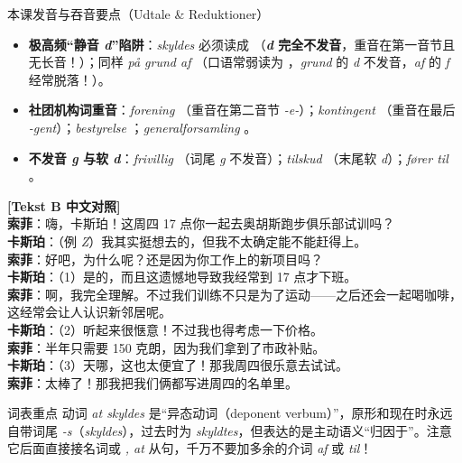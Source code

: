 \begin{tipbox}{本课发音与吞音要点（Udtale \& Reduktioner）}
\begin{itemize}
  \item \textbf{极高频“静音 \textit{d}”陷阱}：\textit{skyldes} 必须读成 （\textbf{\textit{d} 完全不发音}，重音在第一音节且无长音！）；同样 \textit{på grund af} （口语常弱读为 ，\textit{grund} 的 \textit{d} 不发音，\textit{af} 的 \textit{f} 经常脱落！）。
  \item \textbf{社团机构词重音}：\textit{forening} （重音在第二音节 \textit{-e-}）；\textit{kontingent} （重音在最后 \textit{-gent}）；\textit{bestyrelse} ；\textit{generalforsamling} 。
  \item \textbf{不发音 \textit{g} 与软 \textit{d}}：\textit{frivillig} （词尾 \textit{g} 不发音）；\textit{tilskud} （末尾软 \textit{d}）；\textit{fører til} 。
\end{itemize}
\end{tipbox}

\begin{transbox}
\small
\textbf{\color{NCDTeal}[Tekst B 中文对照]}\\
\textbf{索菲}：嗨，卡斯珀！这周四 17 点你一起去奥胡斯跑步俱乐部试训吗？\\
\textbf{卡斯珀}：（例 \textit{Z}）我其实挺想去的，但我不太确定能不能赶得上。\\
\textbf{索菲}：好吧，为什么呢？还是因为你工作上的新项目吗？\\
\textbf{卡斯珀}：（1）是的，而且这遗憾地导致我经常到 17 点才下班。\\
\textbf{索菲}：啊，我完全理解。不过我们训练不只是为了运动——之后还会一起喝咖啡，这经常会让人认识新邻居呢。\\
\textbf{卡斯珀}：（2）听起来很惬意！不过我也得考虑一下价格。\\
\textbf{索菲}：半年只需要 150 克朗，因为我们拿到了市政补贴。\\
\textbf{卡斯珀}：（3）天哪，这也太便宜了！那我周四很乐意去试试。\\
\textbf{索菲}：太棒了！那我把我们俩都写进周四的名单里。
\end{transbox}


\begin{tipbox}{词表重点}
动词 \textit{at skyldes} 是“异态动词（deponent verbum）”，原形和现在时永远自带词尾 \textit{-s}（\textit{skyldes}），过去时为 \textit{skyldtes}，但表达的是主动语义“归因于”。注意它后面直接接名词或 \textit{, at} 从句，千万不要加多余的介词 \textit{af} 或 \textit{til}！
\end{tipbox}

